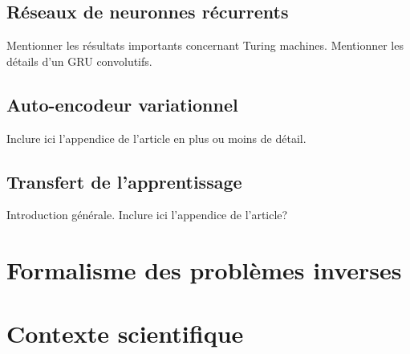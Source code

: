 \subsection{Réseaux de neuronnes récurrents}
Mentionner les résultats importants concernant Turing machines. 
Mentionner les détails d'un GRU convolutifs.



\subsection{Auto-encodeur variationnel}
Inclure ici l'appendice de l'article en plus ou moins de détail.

\subsection{Transfert de l'apprentissage}
Introduction générale.
Inclure ici l'appendice de l'article?

\section{Formalisme des problèmes inverses}\label{sec:formalisme probleme inverse}





\section{Contexte scientifique}\label{sec:contexte}



